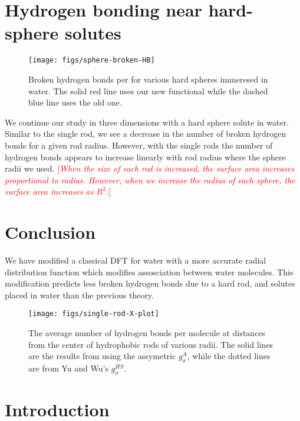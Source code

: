 \documentclass[twocolumn,amsmath,amssymb,prl]{revtex4-1}
\newcommand{\fixme}[1]{\textcolor{red}{[\emph{#1}]}}
\begin{document}
\section{Hydrogen bonding near hard-sphere solutes}

\begin{figure}
\begin{center}
\texttt{[image: figs/sphere-broken-HB]}
\end{center}
\caption{Broken hydrogen bonds per for various hard spheres
  immeresed in water.  The solid red line uses our new functional
  while the dashed blue line uses the old one.}
\label{fig:spheres-broken-HB}
\end{figure}

We continue our study in three dimensions with a hard sphere solute in
water. Similar to the single rod, we see a decrease in the number of
broken hydrogen bonds for a given rod radius. However, with the single
rods the number of hydrogen bonds appears to increase linearly with
rod radius where the sphere radii we used. \fixme{When the size of
  each rod is increased, the surface area increases proportional to
  radius.  However, when we increase the radius of each sphere, the
  surface area increases as $R^2$.}

\section{Conclusion}

We have modified a classical DFT for water with a more accurate radial
distribution function which modifies assosciation between water
molecules. This modification predicts less broken hydrogen bonds due
to a hard rod, and solutes placed in water than the previous theory.

\clearpage
  
\begin{figure}
\begin{center}
\texttt{[image: figs/single-rod-X-plot]}
\end{center}
\caption{ The average number of hydrogen bonds per molecule at
  distances from the center of hydrophobic rods of various
  radii. The solid lines are the results from using the assymetric
  $g_{\sigma}^A$, while the dotted lines are from Yu and Wu's $g_{\sigma}^{HS}$.}
\label{fig:single-rod-X}
\end{figure}
\section{Introduction}
\end{document}
